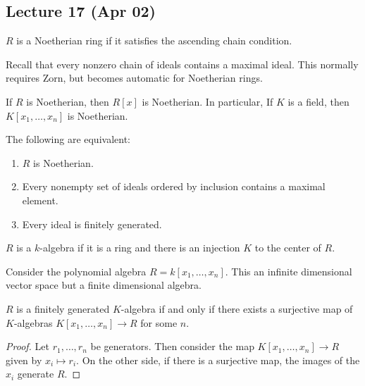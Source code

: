 \documentclass[10pt, twoside]{article}
\begin{document}
        \subsection{Lecture 17 (Apr 02)}

        \begin{defn}
            $R$ is a Noetherian ring if it satisfies the ascending chain condition.
        \end{defn}

        Recall that every nonzero chain of ideals contains a maximal ideal. This normally requires Zorn, but becomes automatic for Noetherian rings.

        \begin{exm}
            If $R$ is Noetherian, then $R[x]$ is Noetherian.
            In particular, If $K$ is a field, then $K[x_1, \ldots, x_n]$ is Noetherian.
        \end{exm}

        \begin{thm}
            The following are equivalent:
            \begin{enumerate}
                \item $R$ is Noetherian.
                \item Every nonempty set of ideals ordered by inclusion contains a maximal element.
                \item Every ideal is finitely generated.
            \end{enumerate}
        \end{thm}

        \begin{defn}[$k$-algebra]
            $R$ is a $k$-algebra if it is a ring and there is an injection $K$ to the center of $R$.
        \end{defn}

        \begin{exm}
            Consider the polynomial algebra $R = k[x_1, \ldots, x_n]$. This an infinite dimensional vector space but a finite dimensional algebra.
        \end{exm}

        \begin{prop}
            $R$ is a finitely generated $K$-algebra if and only if there exists a surjective map of 
            $K$-algebras $K[x_1, \ldots, x_n] \to R$ for some $n$.
            \begin{proof}
                Let $r_1, \ldots, r_n$ be generators. Then consider the map $K[x_1, \ldots, x_n] \to R$ given by $x_i \mapsto r_i$. On the other side, if there is a surjective map, the images of the $x_i$ generate $R$.
            \end{proof}
        \end{prop}
\end{document}
